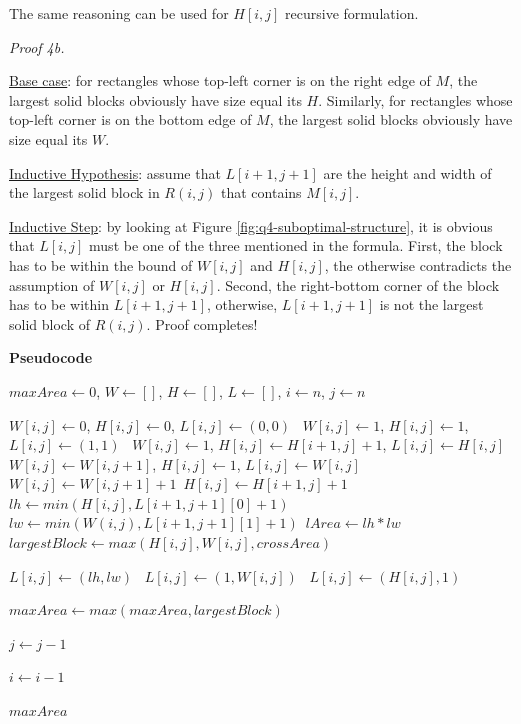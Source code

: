 \documentclass[12pt,article]{article}
\begin{document}
The same reasoning can be used for $H[i,j]$ recursive formulation.

\textit{Proof 4b. } 

\underline{Base case}: for rectangles whose top-left corner is on the right edge of $M$, the largest solid blocks obviously have size equal its $H$. Similarly, for rectangles whose top-left corner is on the bottom edge of $M$, the largest solid blocks obviously have size equal its $W$.

\underline{Inductive Hypothesis}: assume that $L[i+1,j+1]$ are the height and width of the largest solid block in $R(i,j)$ that contains $M[i,j]$.

\underline{Inductive Step}: by looking at Figure \ref{fig:q4-suboptimal-structure}, it is obvious that $L[i,j]$ must be one of the three mentioned in the formula. First, the block has to be within the bound of $W[i,j]$ and $H[i,j]$, the otherwise contradicts the assumption of $W[i,j]$ or $H[i,j]$. Second, the right-bottom corner of the block has to be within $L[i+1,j+1]$, otherwise, $L[i+1,j+1]$ is not the largest solid block of $R(i,j)$. Proof completes!

\textbf{Pseudocode}
\begin{algorithm}
\caption{$M[1:n,1:n]$}\label{alg:q4-L}
\begin{algorithmic}
    \EndIf

    \State $maxArea \gets 0$, $W \gets []$, $H \gets []$, $L \gets []$, $i \gets n$, $j \gets n$

                \State $W[i,j] \gets 0$, $H[i,j] \gets 0$, $L[i,j] \gets (0,0)$\
                \State $W[i,j] \gets 1$, $H[i,j] \gets 1$, $L[i,j] \gets (1,1)$\
                \State $W[i,j] \gets 1$, $H[i,j] \gets H[i+1,j] + 1$, $L[i,j] \gets H[i,j]$\
                \State $W[i,j] \gets W[i,j+1]$, $H[i,j] \gets 1$, $L[i,j] \gets W[i,j]$\
            \Else
                \State $W[i,j] \gets W[i,j+1] + 1$\
                \State $H[i,j] \gets H[i+1,j] + 1$\
                \State $lh \gets min(H[i,j], L[i+1,j+1][0] + 1)$\
                \State $lw \gets min(W(i,j), L[i+1,j+1][1] + 1)$\
                \State $lArea \gets lh * lw$\
                \State $largestBlock \gets max(H[i,j], W[i,j], crossArea)$\

                \If{$lArea == largestBlock$}
                    \State $L[i,j] \gets (lh,lw)$\
                    \State $L[i,j] \gets (1,W[i,j])$\
                \Else
                    \State $L[i,j] \gets (H[i,j],1)$\
                \EndIf

                \State $maxArea \gets max(maxArea, largestBlock)$\
            \EndIf

            \State $j \gets j - 1$
        \EndWhile

        \State $i \gets i - 1$
    \EndWhile

    \Return $maxArea$
\end{algorithmic}
\end{algorithm}
\end{document}
